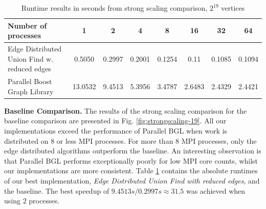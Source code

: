 \documentclass[letterpaper]{article}
\newcommand{\mypar}[1]{{\bf #1.}}
\begin{document}
\begin{table}
  \begin{tabularx}{\linewidth}{ l | c  c  c  c  c  c  c }
    \toprule
    \textbf{Number of processes} & \textbf{1} & \textbf{2} & \textbf{4} & \textbf{8} & \textbf{16} & \textbf{32} & \textbf{64} \\\midrule
    Edge Distributed Union Find w. reduced edges & 0.5050 & 0.2997 & 0.2001 & 0.1254 & 0.11 & 0.1085 & 0.1094 \\ 
    Parallel Boost Graph Library & 13.0532 & 9.4513 & 5.3956 & 3.4787 & 2.6483 & 2.4329 & 2.4421 \\ \bottomrule \hline
  \end{tabularx}
  \caption{Runtime results in seconds from strong scaling comparison, $2^{19}$ vertices}
  \label{tab:strongscaling-19-table}
\end{table}

\mypar{Baseline Comparison}
The results of the strong scaling comparison for the baseline comparison are presented in Fig. \ref{fig:strongscaling-19}.
All our implementations exceed the performance of Parallel BGL when work is distributed on $8$ or
less MPI processes. For more than $8$ MPI processes, only the edge distributed algorithms outperform the baseline. An
interesting observation is that Parallel BGL performs exceptionally poorly for low MPI core counts, whilst our
implementations are more consistent. Table \ref{tab:strongscaling-19-table} contains the absolute runtimes of our
best implementation, \emph{Edge Distributed Union Find with reduced edges}, and the baseline. The best speedup of
$9.4513s/0.2997s \approx 31.5$ was achieved when using $2$ processes.
\end{document}
